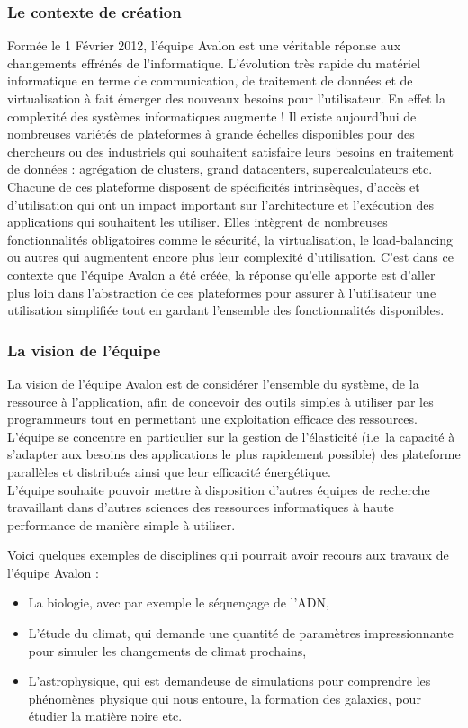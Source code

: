 \subsubsection{Le contexte de création}
Formée le 1 Février 2012, l'équipe Avalon est une véritable réponse aux changements effrénés de l'informatique.
L'évolution très rapide du matériel informatique en terme de communication, de traitement de données et de virtualisation à fait émerger des nouveaux besoins pour l'utilisateur. En effet la complexité des systèmes informatiques augmente !
Il existe aujourd'hui de nombreuses variétés de plateformes à grande échelles disponibles pour des chercheurs ou des industriels qui souhaitent satisfaire leurs besoins en traitement de données : agrégation de \glspl{cluster}, grand \glspl{datacenter}, supercalculateurs etc.
Chacune de ces plateforme disposent de spécificités intrinsèques, d'accès et d'utilisation qui ont un impact important sur l'architecture et l'exécution des applications qui souhaitent les utiliser.
Elles intègrent de nombreuses fonctionnalités obligatoires comme le sécurité, la virtualisation, le \gls{load-balancing} ou autres qui augmentent encore plus leur complexité d'utilisation.
C'est dans ce contexte que l'équipe Avalon a été créée, la réponse qu'elle apporte est d'aller plus loin dans l'abstraction de ces plateformes pour assurer à l'utilisateur une utilisation simplifiée tout en gardant l'ensemble des fonctionnalités disponibles. \cite{avalonAR2012}

\subsubsection{La vision de l'équipe}
La vision de l'équipe Avalon est de considérer l'ensemble du système, de la ressource à l'application, afin de concevoir des outils simples à utiliser par les programmeurs tout en permettant une exploitation efficace des ressources.
L'équipe se concentre en particulier sur la gestion de l'élasticité (i.e\ la capacité à s'adapter aux besoins des applications le plus rapidement possible) des plateforme parallèles et distribués ainsi que leur efficacité énergétique. \cite{avalonAR2012}\\

L'équipe souhaite pouvoir mettre à disposition d'autres équipes de recherche travaillant dans d'autres sciences des ressources informatiques à haute performance de manière simple à utiliser.

Voici quelques exemples de disciplines qui pourrait avoir recours aux travaux de l'équipe Avalon :
\begin{itemize}
	\item La biologie, avec par exemple le séquençage de l'ADN,
	\item L'étude du climat, qui demande une quantité de paramètres impressionnante pour simuler les changements de climat prochains,
	\item L'astrophysique, qui est demandeuse de simulations pour comprendre les phénomènes physique qui nous entoure, la formation des galaxies, pour étudier la matière noire etc.
\end{itemize}
